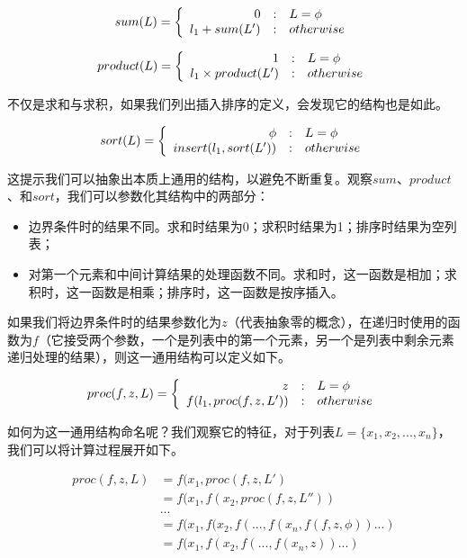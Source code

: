 \documentclass[UTF8]{article}
\begin{document}
\[
sum(L) =  \left \{
  \begin{array}
  {r@{\quad:\quad}l}
  0 & L = \phi \\
  l_1 + sum(L') & otherwise
  \end{array}
\right.
\]

\[
product(L) = \left \{
  \begin{array}
  {r@{\quad:\quad}l}
  1 & L = \phi \\
  l_1 \times product(L') & otherwise
  \end{array}
\right.
\]

不仅是求和与求积，如果我们列出插入排序的定义，会发现它的结构也是如此。

\[
sort(L) = \left \{
  \begin{array}
  {r@{\quad:\quad}l}
  \phi & L = \phi \\
  insert(l_1, sort(L')) & otherwise
  \end{array}
\right.
\]

这提示我们可以抽象出本质上通用的结构，以避免不断重复。观察$sum$、$product$、和$sort$，我们可以参数化其结构中的两部分：

\begin{itemize}
\item 边界条件时的结果不同。求和时结果为0；求积时结果为1；排序时结果为空列表；
\item 对第一个元素和中间计算结果的处理函数不同。求和时，这一函数是相加；求积时，这一函数是相乘；排序时，这一函数是按序插入。
\end{itemize}

如果我们将边界条件时的结果参数化为$z$（代表抽象零的概念），在递归时使用的函数为$f$（它接受两个参数，一个是列表中的第一个元素，另一个是列表中剩余元素递归处理的结果），则这一通用结构可以定义如下。

\[
proc(f, z, L) = \left \{
  \begin{array}
  {r@{\quad:\quad}l}
  z & L = \phi \\
  f(l_1, proc(f, z, L')) & otherwise
  \end{array}
\right.
\]

如何为这一通用结构命名呢？我们观察它的特征，对于列表$L = \{x_1, x_2, ..., x_n \}$，我们可以将计算过程展开如下。

\[
\begin{array}{rl}
proc(f, z, L) & = f(x_1, proc(f, z, L') \\
        & = f(x_1, f(x_2, proc(f, z, L'')) \\
        & ... \\
        & = f(x_1, f(x_2, f(..., f(x_n, f(f, z, \phi))...) \\
        & = f(x_1, f(x_2, f(..., f(x_n, z))...)
\end{array}
\]
\end{document}
